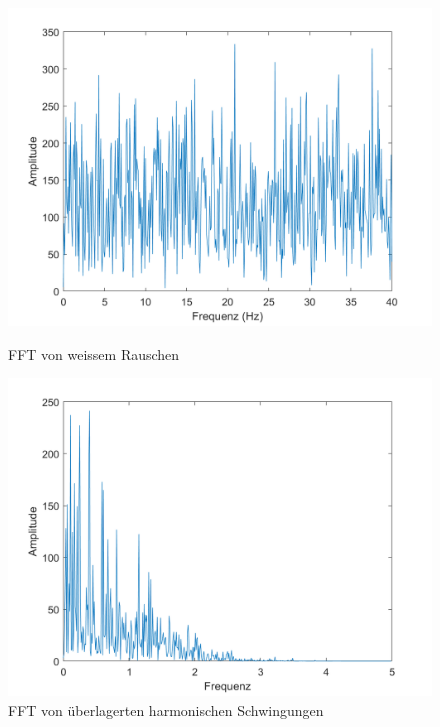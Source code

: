 \begin{figure}
	\begin{minipage}{0.45\textwidth}
		\centering
		\includegraphics[width=\linewidth]{papers/brown/images/FFTweissesRauschen.png}
		\caption{FFT von weissem Rauschen}
		\label{brown:FFTweissesRauschen}
	\end{minipage}
	\hspace{0.05\linewidth}
	\begin{minipage}{0.45\textwidth}
		\centering
		\includegraphics[width=\linewidth]{papers/brown/images/FFT-ueberlagerteSchwingungen.png}
		\caption{FFT von überlagerten harmonischen Schwingungen}
		\label{brown:FFTüberlagerteSchwingungen}
	\end{minipage}
\end{figure}


